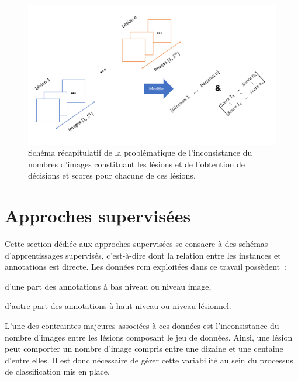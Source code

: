 \begin{figure}[H]
    \centering
    \includegraphics[width=0.65\linewidth]{contents/chapter_7/resources/scheme_patient_decision_objectives.pdf}
    \caption{Schéma récapitulatif de la problématique de l'inconsistance du nombres d'images constituant les lésions et de l'obtention de décisions et scores pour chacune de ces lésions.}
    \label{fig:scheme_patient_decision_objectives}
\end{figure}\par
\clearpage

\section{Approches supervisées}
\label{sec:patient_decision_supervised}
Cette section dédiée aux approches supervisées se consacre à des schémas d'apprentissages supervisés, c'est-à-dire dont la relation entre les instances et annotations est directe. Les données \gls{rcm} exploitées dans ce travail possèdent~:
\begin{inlinerate}
    \item d'une part des annotations à bas niveau ou niveau image,
    \item d'autre part des annotations à haut niveau ou niveau lésionnel. 
\end{inlinerate} L'une des contraintes majeures associées à ces données est l'inconsistance du nombre d'images entre les lésions composant le jeu de données. Ainsi, une lésion peut comporter un nombre d'image compris entre une dizaine et une centaine d'entre elles. Il est donc nécessaire de gérer cette variabilité au sein du processus de classification mis en place.\par

